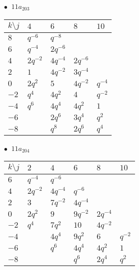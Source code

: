 \begin{minipage}{\linewidth}
$\bullet\ $ $11a_{203}$ \vspace{0.5em} \\
\begin{tabular}{l|llll}
$k \setminus j$ & $4$ & $6$ & $8$ & $10$ \\
\hline
$8$ & $q^{-6}$ & $q^{-8}$ &  &  \\
$6$ & $q^{-4}$ & $2q^{-6}$ &  &  \\
$4$ & $2q^{-2}$ & $4q^{-4}$ & $2q^{-6}$ &  \\
$2$ & $1$ & $4q^{-2}$ & $3q^{-4}$ &  \\
$0$ & $2q^{2}$ & $5$ & $4q^{-2}$ & $q^{-4}$ \\
$-2$ & $q^{4}$ & $4q^{2}$ & $4$ & $q^{-2}$ \\
$-4$ & $q^{6}$ & $4q^{4}$ & $4q^{2}$ & $1$ \\
$-6$ &  & $2q^{6}$ & $3q^{4}$ & $q^{2}$ \\
$-8$ &  & $q^{8}$ & $2q^{6}$ & $q^{4}$ \\
\end{tabular}
\vspace{2em}
\end{minipage}
%
\begin{minipage}{\linewidth}
$\bullet\ $ $11a_{204}$ \vspace{0.5em} \\
\begin{tabular}{l|lllll}
$k \setminus j$ & $2$ & $4$ & $6$ & $8$ & $10$ \\
\hline
$6$ & $q^{-4}$ & $q^{-6}$ &  &  &  \\
$4$ & $2q^{-2}$ & $4q^{-4}$ & $q^{-6}$ &  &  \\
$2$ & $3$ & $7q^{-2}$ & $4q^{-4}$ &  &  \\
$0$ & $2q^{2}$ & $9$ & $9q^{-2}$ & $2q^{-4}$ &  \\
$-2$ & $q^{4}$ & $7q^{2}$ & $10$ & $4q^{-2}$ &  \\
$-4$ &  & $4q^{4}$ & $9q^{2}$ & $6$ & $q^{-2}$ \\
$-6$ &  & $q^{6}$ & $4q^{4}$ & $4q^{2}$ & $1$ \\
$-8$ &  &  & $q^{6}$ & $2q^{4}$ & $q^{2}$ \\
\end{tabular}
\vspace{2em}
\end{minipage}
%
